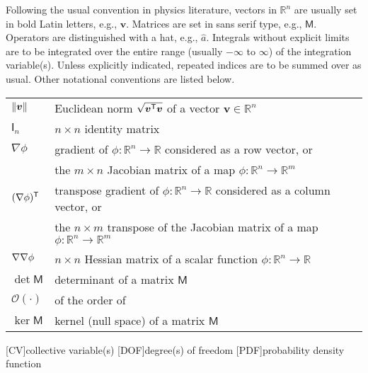 
Following the usual convention in physics literature, vectors in $\mathbb{R}^{n}$ are usually set in bold Latin letters, e.g., $\bm{v}$.
Matrices are set in \textsf{sans serif} type, e.g., $\mathsf{M}$.
Operators are distinguished with a hat, e.g., $\hat{a}$.
Integrals without explicit limits are to be integrated over the entire range (usually $-\infty$ to $\infty$) of the integration variable(s).
Unless explicitly indicated, repeated indices are to be summed over as usual.
Other notational conventions are listed below.\\

\begin{tabular}{ll}
  $\lVert\bm{v}\rVert$ & Euclidean norm $\sqrt{\bm{v}^\mathsf{T}\bm{v}}$ of a vector $\bm{v} \in \mathbb{R}^{n}$\\
  $\mathsf{I}_n$ & $n\times n$ identity matrix\\
  $\nabla \phi$ & gradient of $\phi: \mathbb{R}^n \to \mathbb{R}$ considered as a row vector, or\\
                & the $m\times n$ Jacobian matrix of a map $\phi: \mathbb{R}^n \to \mathbb{R}^m$\\
  $(\nabla\phi)^\mathsf{T}$ & transpose gradient of $\phi: \mathbb{R}^n \to \mathbb{R}$ considered as a column vector, or\\
                & the $n\times m$ transpose of the Jacobian matrix of a map $\phi: \mathbb{R}^n \to \mathbb{R}^m$\\
  $\nabla\nabla \phi$ & $n\times n$ Hessian matrix of a scalar function $\phi: \mathbb{R}^n \to \mathbb{R}$\\
  $\det\mathsf{M}$ & determinant of a matrix $\mathsf{M}$\\
  $\mathcal{O}(\cdot)$ & of the order of\\
  $\ker\mathsf{M}$ & kernel (null space) of a matrix $\mathsf{M}$
\end{tabular}

[CV]{collective variable(s)}
[DOF]{degree(s) of freedom}
[PDF]{probability density function}
